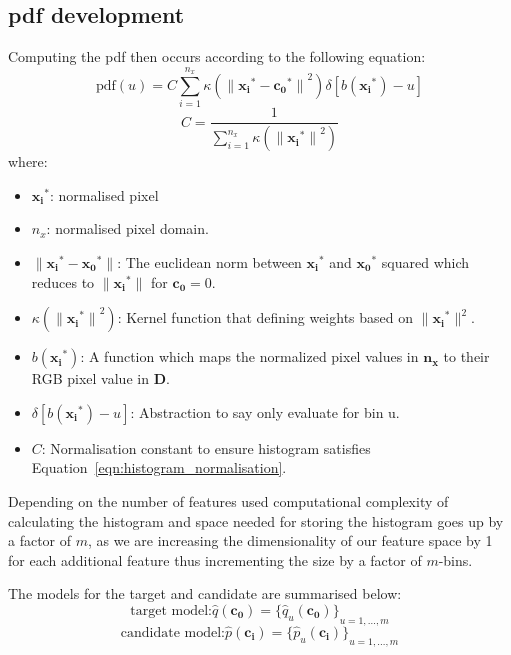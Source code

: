 \subsection{pdf development}
Computing the pdf then occurs according to the following equation:
\begin{equation}\label{eqn:mean_shift_histogram}
    \text{pdf}(u)=C\sum_{i=1}^{n_x}\kappa({\parallel{\mathbf{x_i}^*}-{\mathbf{c_0}^*}\parallel}^2)\delta[b(\mathbf{x_i}^*)-u]    
\end{equation}
\begin{equation}\label{eqn:histogram_normalisation}
    C=\frac{1}{\sum_{i=1}^{n_x}\kappa({\parallel\mathbf{x_i}^*\parallel}^2)}
\end{equation}
where:
\begin{itemize}
    \item $\mathbf{x_i}^*$: normalised pixel 
    \item $n_x$: normalised pixel domain.
    \item $\parallel{\mathbf{x_i}}^*-{\mathbf{x_0}}^*\parallel$: The euclidean
        norm between $\mathbf{x_i}^*$ and ${\mathbf{x_0}}^*$ squared which
        reduces to $\parallel{\mathbf{x_i}}^*\parallel$ for $\mathbf{c_0} = 0$. 
    \item $\kappa({\parallel{\mathbf{x_i}}^*\parallel}^2)$: Kernel function that
        defining weights based on $\parallel{\mathbf{x_i}}^*\parallel^2$.
    \item $b({\mathbf{x_i}}^*)$: A function which maps the normalized pixel
        values in $\mathbf{n_x}$ to their RGB pixel value in $\mathbf{D}$.
    \item $\delta[b({\mathbf{x_i}}^*)-u]$: Abstraction to say only evaluate for bin u.
    \item $C$: Normalisation constant to ensure histogram satisfies Equation~\ref{eqn:histogram_normalisation}.
\end{itemize}

Depending on the number of features used computational complexity of calculating
the histogram and space needed for storing the histogram goes up by a factor of
$m$, as we are increasing the dimensionality of our feature space by 1 for each
additional feature thus incrementing the size by a factor of $m$-bins.

The models for the target and candidate are summarised below:
\[\text{target model:}\hat{q}(\mathbf{c_0}) = {\{\hat{q}_u(\mathbf{c_0})\}}_{u=1,\ldots,m}\]
\[\text{candidate model:}\hat{p}(\mathbf{c_i}) = {\{\hat{p}_u(\mathbf{c_i})\}}_{u=1,\ldots,m}\]

